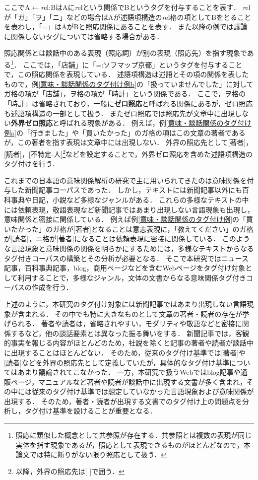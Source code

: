 \documentclass[japanese]{jnlp_1.4}
\begin{document}
ここでA$\leftarrow${\textit rel}:BはAに{\textit rel}という関係でBというタグを付与することを表す．
{\textit rel}が「ガ」「ヲ」「ニ」などの場合はAが述語項構造の{\textit rel}格の項としてBをとることを表わし，「=」はAがBと照応関係にあることを表す．
また以降の例では議論に関係しないタグについては省略する場合がある．

照応関係とは談話中のある表現（照応詞）が別の表現（照応先）を指す現象である\footnote{照応に類似した概念として共参照が存在する．共参照とは複数の表現が同じ実体を指す現象であるが，照応として表現できるものがほとんどなので，本論文では特に断りがない限り照応として扱う．}．
ここでは，「店舗」に「=:ソフマップ京都」というタグを付与することで，この照応関係を表現している．
述語項構造は述語とその項の関係を表したもので，例\ref{意味・談話関係のタグ付け例b}の「扱っていませんでした」に対してガ格の項が「店舗」，ヲ格の項が「時計」という関係である．
ここで，ヲ格の「時計」は省略されており，一般に{\bf ゼロ照応}と呼ばれる関係にあるが，ゼロ照応も述語項構造の一部として扱う．
またゼロ照応では照応先が文章中に出現しない{\bf 外界ゼロ照応}と呼ばれる現象がある．
例えば，例\ref{意味・談話関係のタグ付け例a}の「行きました」や「買いたかった」のガ格の項はこの文章の著者であるが，この著者を指す表現は文章中には出現しない．
外界の照応先として[著者]，[読者]，[不特定-人]\footnote{以降，外界の照応先は[ ]で囲う．}などを設定することで，外界ゼロ照応を含めた述語項構造のタグ付けを行う．


これまでの日本語の意味関係解析の研究で主に用いられてきたのは意味関係を付与した新聞記事コーパスであった\cite{KTC,NTC}．
しかし，テキストには新聞記事以外にも百科事典や日記，小説など多様なジャンルがある．
これらの多様なテキストの中には依頼表現，敬語表現など新聞記事ではあまり出現しない言語現象も出現し，意味関係と密接に関係している．
例えば例\ref{意味・談話関係のタグ付け例}の「買いたかった」のガ格が[著者]となることは意志表現に，「教えてください」のガ格が[読者]，ニ格が[著者]になることは依頼表現に密接に関係している．
このような言語現象と意味関係の関係を明らかにするためには，多様なテキストからなるタグ付きコーパスの構築とその分析が必要となる．
そこで本研究ではニュース記事，百科事典記事，blog，商用ページなどを含むWebページをタグ付け対象として利用することで，多様なジャンル，文体の文書からなる意味関係タグ付きコーパスの作成を行う．

上述のように，本研究のタグ付け対象には新聞記事ではあまり出現しない言語現象が含まれる．
その中でも特に大きなものとして文章の著者・読者の存在が挙げられる．
著者や読者は，省略されやすい，モダリティや敬語などと密接に関係するなど，他の談話要素とは異なった振る舞いをする．
新聞記事では，客観的事実を報じる内容がほとんどのため，社説を除くと記事の著者や読者が談話中に出現することはほとんどない．
そのため，従来のタグ付け基準では[著者]や[読者]などを外界の照応先として定義していたが，具体的なタグ付け基準についてはあまり議論されてこなかった．
一方，本研究で扱うWebではblog記事や通販ページ，マニュアルなど著者や読者が談話中に出現する文書が多く含まれ，その中には従来のタグ付け基準では想定していなかった言語現象および意味関係が出現する．
そのため，著者・読者が出現する文書でのタグ付け上の問題点を分析し，タグ付け基準を設けることが重要となる．
\end{document}
